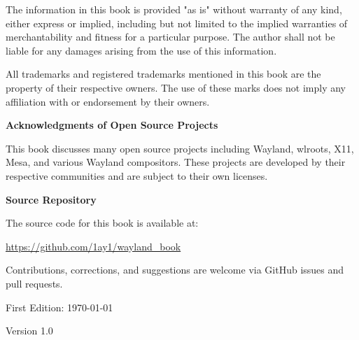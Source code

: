 \noindent
The information in this book is provided "as is" without warranty of any kind, either express or implied, including but not limited to the implied warranties of merchantability and fitness for a particular purpose. The author shall not be liable for any damages arising from the use of this information.

\vspace{0.5cm}

\noindent
All trademarks and registered trademarks mentioned in this book are the property of their respective owners. The use of these marks does not imply any affiliation with or endorsement by their owners.

\vspace{1cm}

\noindent
\textbf{Acknowledgments of Open Source Projects}

\vspace{0.5cm}

\noindent
This book discusses many open source projects including Wayland, wlroots, X11, Mesa, and various Wayland compositors. These projects are developed by their respective communities and are subject to their own licenses.

\vspace{1cm}

\noindent
\textbf{Source Repository}

\vspace{0.5cm}

\noindent
The source code for this book is available at:

\url{https://github.com/1ay1/wayland_book}

\vspace{0.5cm}

\noindent
Contributions, corrections, and suggestions are welcome via GitHub issues and pull requests.

\vspace{1cm}

\noindent
First Edition: \today

\noindent
Version 1.0

\clearpage
